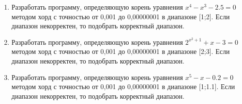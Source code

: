 \begin{enumerate}
    \item Разработать программу, определяющую корень уравнения $x^4-x^3-2.5=0$ методом хорд с точностью от 0,001 до 0,00000001 в диапазоне [1;2]. Если диапазон некорректен, то подобрать корректный диапазон.
    \item Разработать программу, определяющую корень уравнения $2^{x^{2}+1}+x-3=0$ методом хорд с точностью от 0,001 до 0,00000001 в диапазоне [2;3]. Если диапазон некорректен, то подобрать корректный диапазон.
    \item Разработать программу, определяющую корень уравнения $x^5-x-0.2=0$ методом хорд с точностью от 0,001 до 0,00000001 в диапазоне [1;1.1]. Если диапазон некорректен, то подобрать корректный диапазон.
\end{enumerate}

